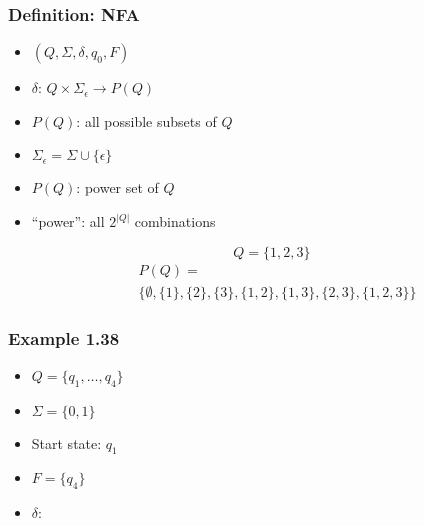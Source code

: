 \begin{frame}[allowframebreaks] \frametitle{Definition: NFA}
  \begin{itemize}
\item $(Q, \Sigma, \delta, q_0, F)$
\item $\delta$: $Q \times \Sigma_\epsilon \rightarrow
P(Q)$

\item [] $P(Q)$: all possible subsets of $Q$
\item $\Sigma_\epsilon
=\Sigma \cup \{\epsilon\}$
\item $P(Q)$: power set of $Q$

\item [] ``power'': all $2^{|Q|}$ combinations 

\begin{equation*}
  Q = \{1,2,3\}
\end{equation*}
\begin{equation*}
  \begin{split}
&  P(Q)= \\
&  \{\emptyset,
\{1\}, \{2\},
\{3\},
\{1,2\},
\{1,3\},
\{2,3\},
\{1,2,3\}\}
\end{split}
\end{equation*}
\end{itemize}\end{frame} \begin{frame}[allowframebreaks] \frametitle{Example 1.38}
  \begin{center}
\end{center}

  \begin{itemize}
\item $Q=\{q_1,\ldots, q_4\}$
\item $\Sigma = \{0,1\}$
\item Start state: $q_1$
\item $F=\{q_4\}$
\item $\delta$:


\end{itemize}
\end{frame}
